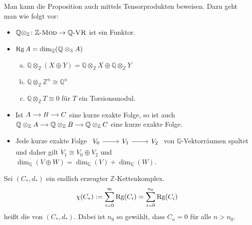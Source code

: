 Man kann die Proposition auch mittels Tensorprodukten beweisen.
Dazu geht man wie folgt vor:
\begin{itemize}
	\item $\mathbb{Q} \otimes_\mathbb{Z} \colon \mathbb{Z}\text{-}\textsc{Mod} \to \mathbb{Q}\text{-}\textsc{VR} $ ist ein Funktor.
	\item $\operatorname{Rg} A= \dim_\mathbb{Q} (\mathbb{Q} \otimes_\mathbb{Z} A)$
	\begin{enumerate}[(a)]
		\item $\mathbb{Q} \otimes_\mathbb{Z} (X \oplus Y) = \mathbb{Q} \otimes_\mathbb{Z} X \oplus  \mathbb{Q} \otimes_\mathbb{Z} Y$
		\item $\mathbb{Q} \otimes_\mathbb{Z} \mathbb{Z}^n \cong \mathbb{Q}^n$
		\item $\mathbb{Q} \otimes_\mathbb{Z} T \cong 0$ für $T$ ein Torsionsmodul.
	\end{enumerate}
	\item Ist $\begin{tikzcd}[cramped,sep=small]
		A \rar & B \rar & C
	\end{tikzcd}$ eine kurze exakte Folge, so ist auch 
	\(
		\begin{tikzcd}[cramped,sep=small]
				\mathbb{Q} \otimes_\mathbb{Z} A \rar & \mathbb{Q} \otimes_\mathbb{Z} B \rar & \mathbb{Q} \otimes_\mathbb{Z} C
			\end{tikzcd}
	\) 
	eine kurze exakte Folge.
	\item Jede kurze exakte Folge $\begin{tikzcd}
		V_0 \rar & V_1 \rar & V_2
	\end{tikzcd}$ von $\mathbb{Q}$-Vektorräumen spaltet und daher gilt $V_1 \cong V_0 \oplus V_2$ und $\dim_\mathbb{Q}(V \oplus W) = \dim_\mathbb{Q}(V)+ \dim_\mathbb{Q} (W)$.
\end{itemize}

\begin{definition}[{name=[{Eulercharakteristik von Z-Kettenkomplexen}]}]
	Sei $(C_*,d_*)$ ein endlich erzeugter $\mathbb{Z}$-Kettenkomplex.
	\[
		\chi(C_*) := \sum_{i=0}^{\infty} \operatorname{Rg}(C_i) = \sum_{i=0}^{n_0} \operatorname{Rg}(C_i) 
	\]
	heißt die  von $(C_*,d_*)$. 
	Dabei ist $n_0$ so gewählt, dass $C_n =0$ für alle $n >n_0$.
\end{definition}

